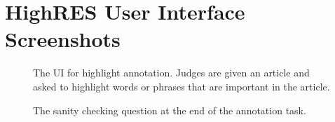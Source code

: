 \documentclass[11pt,a4paper]{article}
\begin{document}
\section{HighRES User Interface Screenshots}
\begin{figure}[ht!]
    \centering
    \caption{The UI for highlight annotation. Judges are given an article and asked to highlight words or phrases that are important in the article.}
\end{figure}
\begin{figure}[ht!]
    \centering
    \caption{The sanity checking question at the end of the annotation task.}
\end{figure}
\end{document}
